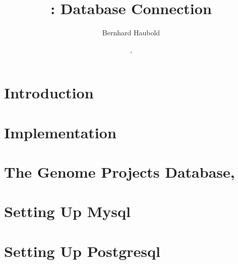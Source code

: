 \documentclass[a4paper]{report}
\begin{document}
\pagestyle{noweb}

\title{: Database Connection\\\scriptsize {}}
\author{Bernhard Haubold}
\date{\hspace{-3pt}, }
\maketitle

\tableofcontents

\chapter{Introduction}

\chapter{Implementation}\label{ch:con}

\chapter{The Genome Projects Database, }\label{ch:gpdb}

\chapter{Setting Up Mysql}\label{ch:mys}

\chapter{Setting Up Postgresql}\label{ch:pos}

\end{document}
